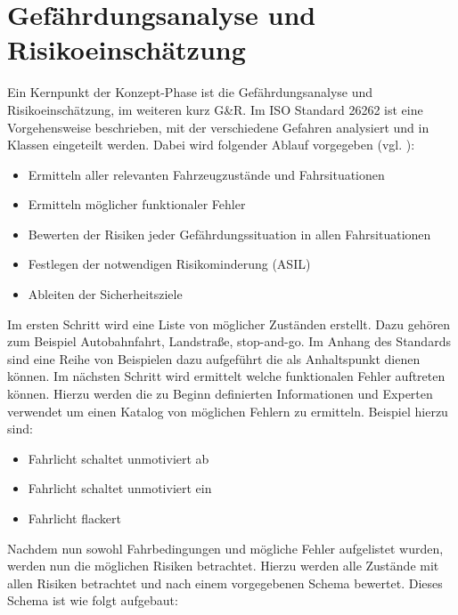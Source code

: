\documentclass[a4paper,DIV=calc,ngerman]{scrartcl}
\begin{document}
\section{Gefährdungsanalyse und Risikoeinschätzung}
\label{sec:GundR}
Ein Kernpunkt der Konzept-Phase ist die Gefährdungsanalyse und Risikoeinschätzung, im weiteren kurz G\&R. Im ISO Standard 26262 ist eine Vorgehensweise beschrieben, mit der verschiedene Gefahren analysiert und in Klassen eingeteilt werden. Dabei wird folgender Ablauf vorgegeben (vgl. \cite[S. 123]{1}):

\begin{itemize}
    \item Ermitteln aller relevanten Fahrzeugzustände und Fahrsituationen
    \item Ermitteln möglicher funktionaler Fehler
    \item Bewerten der Risiken jeder Gefährdungssituation in allen Fahrsituationen
    \item Festlegen der notwendigen Risikominderung (ASIL)
    \item Ableiten der Sicherheitsziele
\end{itemize}

Im ersten Schritt wird eine Liste von möglicher Zuständen erstellt. Dazu gehören zum Beispiel Autobahnfahrt, Landstraße, stop-and-go. Im Anhang des Standards sind eine Reihe von Beispielen dazu aufgeführt die als Anhaltspunkt dienen können. Im nächsten Schritt wird ermittelt welche funktionalen Fehler auftreten können. Hierzu werden die zu Beginn definierten Informationen und Experten verwendet um einen Katalog von möglichen Fehlern zu ermitteln. Beispiel hierzu sind:

\begin{itemize}
    \item Fahrlicht schaltet unmotiviert ab
    \item Fahrlicht schaltet unmotiviert ein
    \item Fahrlicht flackert
\end{itemize}

Nachdem nun sowohl Fahrbedingungen und mögliche Fehler aufgelistet wurden, werden nun die möglichen Risiken betrachtet. Hierzu werden alle Zustände mit allen Risiken betrachtet und nach einem vorgegebenen Schema bewertet. Dieses Schema ist wie folgt aufgebaut:
\end{document}
